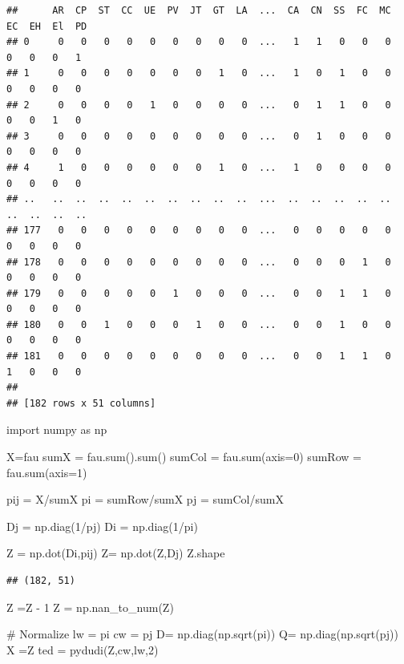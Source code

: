 \documentclass[
  10pt,
]{article}
\newenvironment{Shaded}{\begin{snugshade}}{\end{snugshade}}
\newcommand{\NormalTok}[1]{#1}
\begin{document}
\begin{verbatim}
##      AR  CP  ST  CC  UE  PV  JT  GT  LA  ...  CA  CN  SS  FC  MC  EC  EH  El  PD
## 0     0   0   0   0   0   0   0   0   0  ...   1   1   0   0   0   0   0   0   1
## 1     0   0   0   0   0   0   0   1   0  ...   1   0   1   0   0   0   0   0   0
## 2     0   0   0   0   1   0   0   0   0  ...   0   1   1   0   0   0   0   1   0
## 3     0   0   0   0   0   0   0   0   0  ...   0   1   0   0   0   0   0   0   0
## 4     1   0   0   0   0   0   0   1   0  ...   1   0   0   0   0   0   0   0   0
## ..   ..  ..  ..  ..  ..  ..  ..  ..  ..  ...  ..  ..  ..  ..  ..  ..  ..  ..  ..
## 177   0   0   0   0   0   0   0   0   0  ...   0   0   0   0   0   0   0   0   0
## 178   0   0   0   0   0   0   0   0   0  ...   0   0   0   1   0   0   0   0   0
## 179   0   0   0   0   0   1   0   0   0  ...   0   0   1   1   0   0   0   0   0
## 180   0   0   1   0   0   0   1   0   0  ...   0   0   1   0   0   0   0   0   0
## 181   0   0   0   0   0   0   0   0   0  ...   0   0   1   1   0   1   0   0   0
## 
## [182 rows x 51 columns]
\end{verbatim}

\begin{Shaded}
\begin{Highlighting}[]
\NormalTok{import numpy as np}

\NormalTok{X=fau}
\NormalTok{sumX = fau.sum().sum()}
\NormalTok{sumCol =  fau.sum(axis=0)}
\NormalTok{sumRow = fau.sum(axis=1)}

\NormalTok{pij = X/sumX}
\NormalTok{pi = sumRow/sumX}
\NormalTok{pj = sumCol/sumX}

\NormalTok{Dj = np.diag(1/pj)}
\NormalTok{Di = np.diag(1/pi)}

\NormalTok{Z = np.dot(Di,pij)}
\NormalTok{Z= np.dot(Z,Dj)}
\NormalTok{Z.shape}
\end{Highlighting}
\end{Shaded}

\begin{verbatim}
## (182, 51)
\end{verbatim}

\begin{Shaded}
\begin{Highlighting}[]
\NormalTok{Z =Z {-} 1}
\NormalTok{Z = np.nan\_to\_num(Z)}

\NormalTok{\# Normalize}
\NormalTok{lw = pi}
\NormalTok{cw = pj}
\NormalTok{D= np.diag(np.sqrt(pi))}
\NormalTok{Q= np.diag(np.sqrt(pj))}
\NormalTok{X =Z}
\NormalTok{ted = pydudi(Z,cw,lw,2)}
\end{Highlighting}
\end{Shaded}
\end{document}
